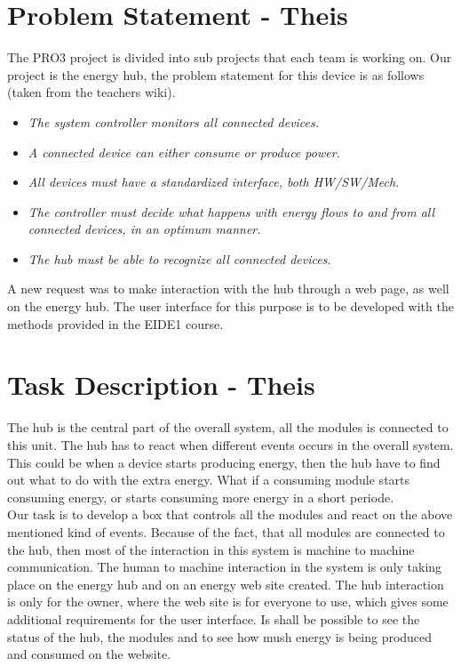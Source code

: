 \section{Problem Statement - Theis}
The PRO3 project is divided into sub projects that each team is working on. Our project is the energy hub, the problem statement for this device is as follows (taken from the teachers wiki).
\begin{itemize}
	\item\textit{The system controller monitors all connected devices.}
	\item\textit{A connected device can either consume or produce power.}
	\item\textit{All devices must have a standardized interface, both HW/SW/Mech.}
	\item\textit{The controller must decide what happens with energy flows to and from all connected devices, in an optimum manner.}
	\item\textit{The hub must be able to recognize all connected devices.}
\end{itemize}
A new request was to make interaction with the hub through a web page, as well on the energy hub. The user interface for this purpose is to be developed with the methods provided in the EIDE1 course.


\section{Task Description - Theis}
The hub is the central part of the overall system, all the modules is connected to this unit. The hub has to react when different events occurs in the overall system. This could be when a device starts producing energy, then the hub have to find out what to do with the extra energy. What if a consuming module starts consuming energy, or starts consuming more energy in a short periode. 
\\[0.2cm]
Our task is to develop a box that controls all the modules and react on the above mentioned kind of events. Because of the fact, that all modules are connected to the hub, then most of the interaction in this system is machine to machine communication. The human to machine interaction in the system is only taking place on the energy hub and on an energy web site created. The hub interaction is only for the owner, where the web site is for everyone to use, which gives some additional requirements for the user interface. Is shall be possible to see the status of the hub, the modules and to see how mush energy is being produced and consumed on the website.

